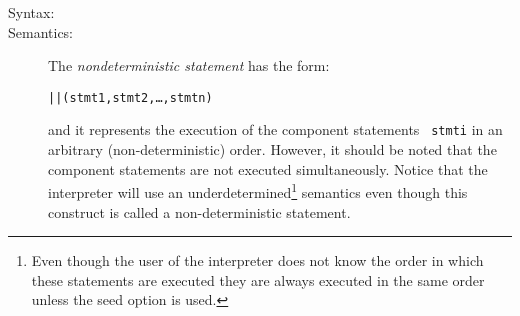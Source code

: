 \documentclass[\pformat,12pt]{article}
\begin{document}
\begin{description}
\item[Syntax:]
  

\item[Semantics:] The {\it nondeterministic statement} has the form:
  \begin{alltt}
    || (stmt1, stmt2, \ldots, stmtn)
  \end{alltt}
  and it represents the execution of the component statements {\tt
    stmti} in an arbitrary (non-deterministic)
  order. However, it
  should be noted that the component statements are not executed
  simultaneously. Notice that the interpreter will use an
  underdetermined\footnote{Even though the
    user of the interpreter does not know
    the order in which these statements are executed they are always
    executed in the same order unless the seed option is used.} semantics even though this construct
  is called a non-deterministic statement.


\end{description}
\end{document}
